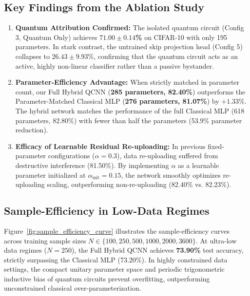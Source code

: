\documentclass[10pt,twocolumn,twoside,a4paper]{article}
\begin{document}
\subsection{Key Findings from the Ablation Study}
\begin{enumerate}
    \item \textbf{Quantum Attribution Confirmed:} The isolated quantum circuit (Config 3, Quantum Only) achieves \textbf{$71.00 \pm 0.14$\%} on CIFAR-10 with only 195 parameters. In stark contrast, the untrained skip projection head (Config 5) collapses to $26.43 \pm 9.93$\%, confirming that the quantum circuit acts as an active, highly non-linear classifier rather than a passive bystander.
    \item \textbf{Parameter-Efficiency Advantage:} When strictly matched in parameter count, our Full Hybrid QCNN (\textbf{285 parameters, 82.40\%}) outperforms the Parameter-Matched Classical MLP (\textbf{276 parameters, 81.07\%}) by $+1.33$\%. The hybrid network matches the performance of the full Classical MLP (618 parameters, 82.80\%) with fewer than half the parameters (53.9\% parameter reduction).
    \item \textbf{Efficacy of Learnable Residual Re-uploading:} In previous fixed-parameter configurations ($\alpha = 0.3$), data re-uploading suffered from destructive interference (81.50\%). By implementing $\alpha$ as a learnable parameter initialized at $\alpha_{\text{init}} = 0.15$, the network smoothly optimizes re-uploading scaling, outperforming non-re-uploading (82.40\% vs. 82.23\%).
\end{enumerate}

\subsection{Sample-Efficiency in Low-Data Regimes}
Figure~\ref{fig:sample_efficiency_curve} illustrates the sample-efficiency curves across training sample sizes $N \in \{100, 250, 500, 1000, 2000, 3600\}$. At ultra-low data regimes ($N = 250$), the Full Hybrid QCNN achieves \textbf{73.90\%} test accuracy, strictly surpassing the Classical MLP (73.20\%). In highly constrained data settings, the compact unitary parameter space and periodic trigonometric inductive bias of quantum circuits prevent overfitting, outperforming unconstrained classical over-parameterization.

\end{document}
